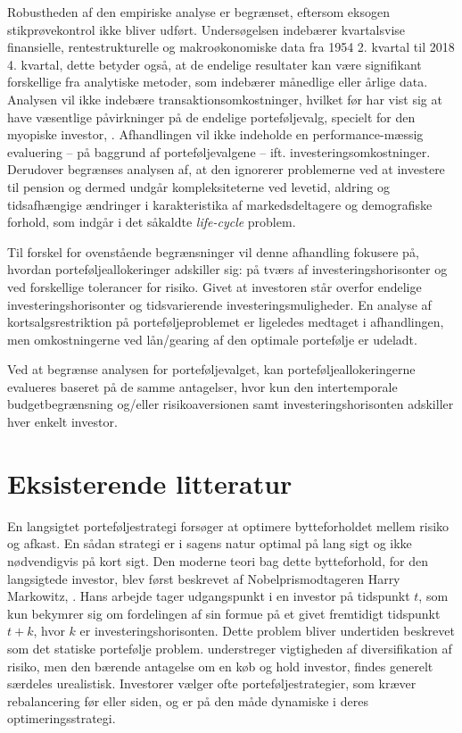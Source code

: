 \documentclass[
  a4paper,
  oneside]{memoir}
\begin{document}
Robustheden af den empiriske analyse er begrænset, eftersom eksogen stikprøvekontrol ikke bliver udført. Undersøgelsen indebærer kvartalsvise finansielle, rentestrukturelle og makroøkonomiske data fra 1954 2. kvartal til 2018 4. kvartal, dette betyder også, at de endelige resultater kan være signifikant forskellige fra analytiske metoder, som indebærer månedlige eller årlige data. Analysen vil ikke indebære transaktionsomkostninger, hvilket før har vist sig at have væsentlige påvirkninger på de endelige porteføljevalg, specielt for den myopiske investor, \citep{BalLyn1999}. Afhandlingen vil ikke indeholde en performance-mæssig evaluering -- på baggrund af porteføljevalgene -- ift. investeringsomkostninger. Derudover begrænses analysen af, at den ignorerer problemerne ved at investere til pension og dermed undgår kompleksiteterne ved levetid, aldring og tidsafhængige ændringer i karakteristika af markedsdeltagere og demografiske forhold, som indgår i det såkaldte \emph{life-cycle} problem.

Til forskel for ovenstående begrænsninger vil denne afhandling fokusere på, hvordan porteføljeallokeringer adskiller sig: på tværs af investeringshorisonter og ved forskellige tolerancer for risiko. Givet at investoren står overfor endelige investeringshorisonter og tidsvarierende investeringsmuligheder.
En analyse af kortsalgsrestriktion på porteføljeproblemet er ligeledes medtaget i afhandlingen, men omkostningerne ved lån/gearing af den optimale portefølje er udeladt.

Ved at begrænse analysen for porteføljevalget, kan porteføljeallokeringerne evalueres baseret på de samme antagelser, hvor kun den intertemporale budgetbegrænsning og/eller risikoaversionen samt investeringshorisonten adskiller hver enkelt investor.

\hypertarget{eksisterende-litteratur}{%
\section{Eksisterende litteratur}\label{eksisterende-litteratur}}

En langsigtet porteføljestrategi forsøger at optimere bytteforholdet mellem risiko og afkast. En sådan strategi er i sagens natur optimal på lang sigt og ikke nødvendigvis på kort sigt. Den moderne teori bag dette bytteforhold, for den langsigtede investor, blev først beskrevet af Nobelprismodtageren Harry Markowitz, \citep{Markowitz1952}. Hans arbejde tager udgangspunkt i en investor på tidspunkt \(t\), som kun bekymrer sig om fordelingen af sin formue på et givet fremtidigt tidspunkt \(t+k\), hvor \(k\) er investeringshorisonten. Dette problem bliver undertiden beskrevet som det statiske portefølje problem. \citep{Markowitz1952} understreger vigtigheden af diversifikation af risiko, men den bærende antagelse om en køb og hold investor, findes generelt særdeles urealistisk. Investorer vælger ofte porteføljestrategier, som kræver rebalancering før eller siden, og er på den måde dynamiske i deres optimeringsstrategi.
\end{document}
